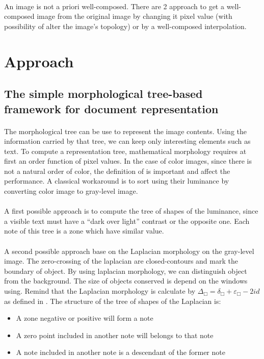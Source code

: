 \documentclass[12pt,a4paper]{report}
\begin{document}
\paragraph{}
An image is not a priori well-composed. There are 2 approach to get a well-composed image from the original image \cite{Geraud.15.ismm} by changing it pixel value (with possibility of alter the image's topology) or by a well-composed interpolation.

\section{Approach}
\subsection{The simple morphological tree-based framework for document representation}
\paragraph{}
The morphological tree can be use to represent the image contents. Using the information carried by that tree, we can keep only interesting elements such as text. To compute a representation tree, mathematical morphology requires at first an order function of pixel values. In the case of color images, since there is not a natural order of color, the definition of is important and affect the performance. A classical workaround is to sort using their luminance by converting color image to gray-level image. 
\paragraph{}
A first possible approach is to compute the tree of shapes of the luminance, since a visible text must have a “dark over light” contrast or the opposite one. Each note of this tree is a zone which have similar value.
\paragraph{}
A second possible approach base on the Laplacian morphology on the gray-level image. The zero-crossing of the laplacian are closed-contours and mark the boundary of object. By using laplacian morphology, we can distinguish object from the background. The size of objects conserved is depend on the windows using. Remind that the Laplacian morphology is calculate by $ \Delta_\Box = \delta_\Box + \varepsilon_\Box -2id $ as defined in \cite{Vliet_anedge}. The structure of the tree of shapes of the Laplacian is:
\begin{itemize}
\item A zone negative or positive will form a note
\item A zero point included in another note will belongs to that note
\item A note included in another note is a descendant of the former note
\end{itemize}
\end{document}
